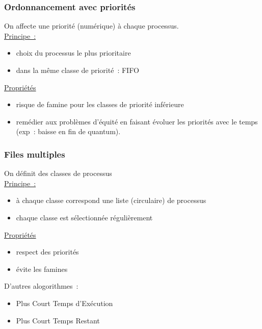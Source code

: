 \begin{frame}
  \frametitle{Ordonnancement avec priorités}
  
  On affecte une priorité (numérique) à chaque processus.\\

  \underline{Principe~:}
  \begin{itemize}
  \item choix du processus le plus prioritaire
  \item dans la même classe de priorité~: FIFO
  \end{itemize}
  \vspace{0.5cm}

  \underline{Propriétés}
  \begin{itemize}
  \item risque de famine pour les classes de priorité inférieure
  \item[\ding{212}] remédier aux problèmes d'équité en faisant évoluer les priorités
    avec le temps (exp~: baisse en fin de quantum).
  \end{itemize}
\end{frame}

\begin{frame}
  \frametitle{Files multiples}
    On définit des \alert{classes} de processus\\
    \underline{Principe~:}
    \begin{itemize}
    \item à chaque classe correspond une liste (circulaire) de processus
    \item chaque classe est sélectionnée régulièrement
    \end{itemize}
    \vspace{0.2cm}
    \underline{Propriétés}
    \begin{itemize}
    \item respect des priorités
    \item évite les famines
    \end{itemize}

\vspace{0.5cm}
D'autres alogorithmes~: 
\begin{itemize}
\item Plus Court Temps d'Exécution
\item  Plus Court Temps Restant
\end{itemize}
\end{frame}





